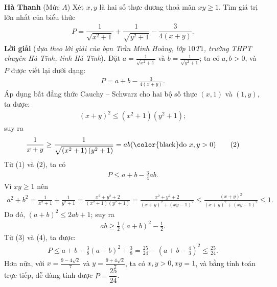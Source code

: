 \begin{multicols}{2}
	\vskip 0.05cm
	\hfill \textbf{Hà Thanh}
	\vskip 0.05cm
	{}
	(Mức $A$) Xét $x,y$ là hai số thực dương thoả mãn $xy\ge 1$. Tìm giá trị lớn nhất của biểu thức
	\begin{align*}
		P=\dfrac1{\sqrt{x^2+1}}+\dfrac1{\sqrt{y^2+1}}-\dfrac3{4(x+y)}.
	\end{align*}
	\textbf{Lời giải} (\textit{dựa theo lời giải của bạn Trần Minh Hoàng, lớp $10$T$1$, trường THPT chuyên Hà Tĩnh, tỉnh Hà Tĩnh})\textbf{.}
	\vskip 0.05cm
	Đặt $a = \frac{1}{{\sqrt {{x^2} + 1} }}$  và  $b = \frac{1}{{\sqrt {{y^2} + 1} }}$; ta có $a, b > 0$, và $P$ được viết lại dưới dạng:
	\begin{align*}
		P = a + b - \frac{3}{{4\left( {x + y} \right)}}. \tag{$1$}
	\end{align*}
	Áp dụng bất đẳng thức Cauchy -- Schwarz cho hai bộ số thực $(x, 1)$ và $(1, y)$, ta được:
	\begin{align*}
		{\left( {x + y} \right)^2} \le \left( {{x^2} + 1} \right)\left( {{y^2} + 1} \right);
	\end{align*}
	suy ra
	\begin{align*}
		\frac{1}{{x + y}} \ge \frac{1}{{\sqrt {\left( {{x^2} + 1} \right)\left( {{y^2} + 1} \right)} }} = ab (\text{\color{black}do } x,y >0) \tag{$2$}
	\end{align*}
	Từ ($1$) và ($2$), ta có
	\begin{align*}
		P \le a + b - \frac{3}{4}ab. \tag{$3$}
	\end{align*}
	Vì $xy \ge 1$ nên
	\begin{align*}
		{a^2} + {b^2} = \frac{1}{{{x^2} + 1}} + \frac{1}{{{y^2} + 1}} = \frac{{{x^2} + {y^2} + 2}}{{\left( {{x^2} + 1} \right)\left( {{y^2} + 1} \right)}} = \frac{{{x^2} + {y^2} + 2}}{{{{\left( {x + y} \right)}^2} + {{\left( {xy - 1} \right)}^2}}} \le \frac{{{{\left( {x + y} \right)}^2}}}{{{{\left( {x + y} \right)}^2} + {{\left( {xy - 1} \right)}^2}}} \le 1.
	\end{align*}
	Do đó, ${\left( {a + b} \right)^2} \le 2ab + 1$; suy ra
	\begin{align*}
		ab \ge \frac{1}{2}{\left( {a + b} \right)^2} - \frac{1}{2}.
	\end{align*}
	Từ ($3$) và ($4$), ta được:
	\begin{align*}
		P \le a + b - \frac{3}{8}{\left( {a + b} \right)^2} + \frac{3}{8} = \frac{{25}}{{24}} - {\left( {a + b - \frac{4}{3}} \right)^2} \le \frac{{25}}{{24}}.
	\end{align*}
	Hơn nữa, với  $x = \frac{{9 - 4\sqrt 2 }}{7}$ và  $y = \frac{{9 + 4\sqrt 2 }}{7}$, ta có $x, y > 0, xy = 1$, và bằng tính toán trực tiếp, dễ dàng tính được  $P = \dfrac{25}{24}$.

\end{multicols}
